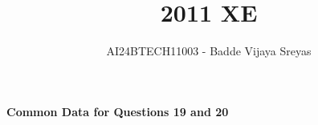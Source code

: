 \documentclass[journal]{IEEEtran}
\begin{document}

\vspace{3cm}

\title{2011 XE}
\author{AI24BTECH11003 - Badde Vijaya Sreyas}
{\let\newpage\relax\maketitle}

\renewcommand{\thefigure}{\theenumi}
\renewcommand{\thetable}{\theenumi}
\setlength{\intextsep}{10pt} %


\renewcommand{\thetable}{\theenumi}

\textbf{Common Data for Questions 19 and 20}
\end{document}
